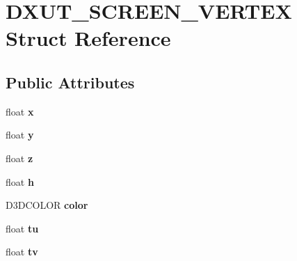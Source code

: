 \hypertarget{struct_d_x_u_t___s_c_r_e_e_n___v_e_r_t_e_x}{\section{D\+X\+U\+T\+\_\+\+S\+C\+R\+E\+E\+N\+\_\+\+V\+E\+R\+T\+E\+X Struct Reference}
\label{struct_d_x_u_t___s_c_r_e_e_n___v_e_r_t_e_x}
}
\subsection*{Public Attributes}
\begin{DoxyCompactItemize}
\item 
\hypertarget{struct_d_x_u_t___s_c_r_e_e_n___v_e_r_t_e_x_a86437d26d068a9faeb2802b35b55940d}{float {\bfseries x}}\label{struct_d_x_u_t___s_c_r_e_e_n___v_e_r_t_e_x_a86437d26d068a9faeb2802b35b55940d}

\item 
\hypertarget{struct_d_x_u_t___s_c_r_e_e_n___v_e_r_t_e_x_a6a731737070bef7655f01dbed96fda89}{float {\bfseries y}}\label{struct_d_x_u_t___s_c_r_e_e_n___v_e_r_t_e_x_a6a731737070bef7655f01dbed96fda89}

\item 
\hypertarget{struct_d_x_u_t___s_c_r_e_e_n___v_e_r_t_e_x_ac036ee8f17d574b27aa47b2e9327ee00}{float {\bfseries z}}\label{struct_d_x_u_t___s_c_r_e_e_n___v_e_r_t_e_x_ac036ee8f17d574b27aa47b2e9327ee00}

\item 
\hypertarget{struct_d_x_u_t___s_c_r_e_e_n___v_e_r_t_e_x_a07f8215a46cdcfb9cd7a6e5d205dd794}{float {\bfseries h}}\label{struct_d_x_u_t___s_c_r_e_e_n___v_e_r_t_e_x_a07f8215a46cdcfb9cd7a6e5d205dd794}

\item 
\hypertarget{struct_d_x_u_t___s_c_r_e_e_n___v_e_r_t_e_x_a4a1e6ac32a7e752e8ce6f60cad1469f6}{D3\+D\+C\+O\+L\+O\+R {\bfseries color}}\label{struct_d_x_u_t___s_c_r_e_e_n___v_e_r_t_e_x_a4a1e6ac32a7e752e8ce6f60cad1469f6}

\item 
\hypertarget{struct_d_x_u_t___s_c_r_e_e_n___v_e_r_t_e_x_a3598a58452fda2c5ae7fac091c3ef64e}{float {\bfseries tu}}\label{struct_d_x_u_t___s_c_r_e_e_n___v_e_r_t_e_x_a3598a58452fda2c5ae7fac091c3ef64e}

\item 
\hypertarget{struct_d_x_u_t___s_c_r_e_e_n___v_e_r_t_e_x_adfeea1725a0f11599eab7544a2ee1649}{float {\bfseries tv}}\label{struct_d_x_u_t___s_c_r_e_e_n___v_e_r_t_e_x_adfeea1725a0f11599eab7544a2ee1649}

\end{DoxyCompactItemize}
